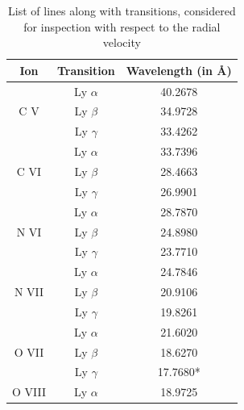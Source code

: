                 \renewcommand{\arraystretch}{1.2}
                \begin{table}[h!]
                    \centering
                    \caption{List of lines along with transitions, considered for inspection with respect to the radial velocity}
                    \label{tab:line-list}
                    \begin{tabular}{ccc}
                        \hline
                        \textbf{Ion} & \textbf{Transition} & \textbf{Wavelength (in \AA)} \\ \hline
                        \multirow{3}{*}{C V}      & {Ly $\alpha$} & {40.2678} \\ %
                                                  & {Ly $\beta$}  & {34.9728} \\ %
                                                  & {Ly $\gamma$} & {33.4262} \\ \hline
                        \multirow{3}{*}{C VI}     & {Ly $\alpha$} & {33.7396} \\ %
                                                  & {Ly $\beta$}  & {28.4663} \\ %
                                                  & {Ly $\gamma$} & {26.9901} \\ \hline
                        \multirow{3}{*}{N VI}     & {Ly $\alpha$} & {28.7870} \\ %
                                                  & {Ly $\beta$}  & {24.8980} \\ %
                                                  & {Ly $\gamma$} & {23.7710} \\ \hline
                        \multirow{3}{*}{N VII}    & {Ly $\alpha$} & {24.7846} \\ %
                                                  & {Ly $\beta$}  & {20.9106} \\ %
                                                  & {Ly $\gamma$} & {19.8261} \\ \hline
                        \multirow{3}{*}{O VII}    & {Ly $\alpha$} & {21.6020} \\ %
                                                  & {Ly $\beta$}  & {18.6270} \\ %
                                                  & {Ly $\gamma$} & {17.7680*} \\ \hline
                        \multirow{3}{*}{O VIII}   & {Ly $\alpha$} & {18.9725} \\ %

\end{tabular}
\end{table}
